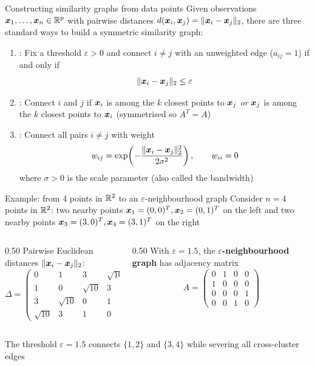 \documentclass[aspectratio=169]{beamer}\usepackage[]{graphicx}\usepackage[]{xcolor}
\begin{document}
\begin{frame}{Constructing similarity graphs from data points}
Given observations $\bm{x}_1, \ldots, \bm{x}_n \in \mathbb{R}^p$ with pairwise distances $d(\bm{x}_i, \bm{x}_j) = \|\bm{x}_i - \bm{x}_j\|_2$, there are three standard ways to build a symmetric similarity graph:
\vfill
\begin{enumerate}
\item {}: Fix a threshold $\varepsilon > 0$ and connect $i \neq j$ with an unweighted edge ($a_{ij} = 1$) if and only if
\[
\|\bm{x}_i - \bm{x}_j\|_2 \le \varepsilon
\]
\item {}: Connect $i$ and $j$ if $\bm{x}_i$ is among the $k$ closest points to $\bm{x}_j$ \emph{or} $\bm{x}_j$ is among the $k$ closest points to $\bm{x}_i$ (symmetrised so $A^T = A$)
\vfill
\item {}: Connect all pairs $i \neq j$ with weight
\[
w_{ij} = \exp\!\left(-\frac{\|\bm{x}_i - \bm{x}_j\|_2^2}{2\sigma^2}\right), \qquad w_{ii} = 0
\]
where $\sigma > 0$ is the scale parameter (also called the bandwidth)
\end{enumerate}
\end{frame}


\begin{frame}{Example: from 4 points in $\mathbb{R}^2$ to an $\varepsilon$-neighbourhood graph}
Consider $n = 4$ points in $\mathbb{R}^2$: two nearby points $\bm{x}_1 = (0, 0)^T, \bm{x}_2 = (0, 1)^T$ on the left and two nearby points $\bm{x}_3 = (3, 0)^T, \bm{x}_4 = (3, 1)^T$ on the right
\vfill
\begin{columns}[c]
\begin{column}{0.50\textwidth}
Pairwise Euclidean distances $\|\bm{x}_i - \bm{x}_j\|_2$:
\[
\Delta = \begin{pmatrix}
0 & 1 & 3 & \sqrt{10} \\
1 & 0 & \sqrt{10} & 3 \\
3 & \sqrt{10} & 0 & 1 \\
\sqrt{10} & 3 & 1 & 0
\end{pmatrix}
\]
\end{column}
\begin{column}{0.50\textwidth}
With $\varepsilon = 1.5$, the \textbf{$\varepsilon$-neighbourhood graph} has adjacency matrix
\[
A = \begin{pmatrix}
0 & 1 & 0 & 0 \\
1 & 0 & 0 & 0 \\
0 & 0 & 0 & 1 \\
0 & 0 & 1 & 0
\end{pmatrix}
\]
\end{column}
\end{columns}
\vfill
The threshold $\varepsilon = 1.5$ connects $\{1, 2\}$ and $\{3, 4\}$ while severing all cross-cluster edges
\end{frame}
\end{document}
